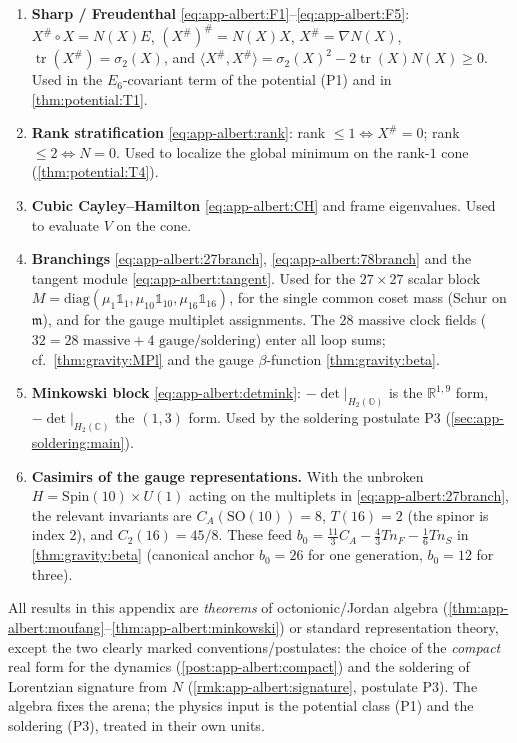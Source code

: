 \begin{enumerate}
  \item \textbf{Sharp / Freudenthal} \eqref{eq:app-albert:F1}--\eqref{eq:app-albert:F5}:
    $X^\#\circ X=N(X)E$, $(X^\#)^\#=N(X)X$, $X^\#=\nabla N(X)$,
    $\operatorname{tr}(X^\#)=\sigma_2(X)$, and
    $\langle X^\#,X^\#\rangle=\sigma_2(X)^2-2\operatorname{tr}(X)N(X)\ge0$. Used in
    the $E_6$-covariant term of the potential (P1) and in
    \autoref{thm:potential:T1}.
  \item \textbf{Rank stratification} \eqref{eq:app-albert:rank}: rank $\le1
    \Leftrightarrow X^\#=0$; rank $\le2\Leftrightarrow N=0$. Used to localize the
    global minimum on the rank-$1$ cone (\autoref{thm:potential:T4}).
  \item \textbf{Cubic Cayley--Hamilton} \eqref{eq:app-albert:CH} and frame
    eigenvalues. Used to evaluate $V$ on the cone.
  \item \textbf{Branchings} \eqref{eq:app-albert:27branch},
    \eqref{eq:app-albert:78branch} and the tangent module
    \eqref{eq:app-albert:tangent}. Used for the $27\times27$ scalar block
    $M=\mathrm{diag}(\mu_1\mathbb 1_1,\mu_{10}\mathbb 1_{10},\mu_{16}\mathbb 1_{16})$,
    for the single common coset mass (Schur on $\mathfrak m$), and for the gauge
    multiplet assignments. The $28$ massive clock fields
    ($32=28\text{ massive}+4\text{ gauge/soldering}$) enter all loop sums; cf.\
    \autoref{thm:gravity:MPl} and the gauge $\beta$-function
    \autoref{thm:gravity:beta}.
  \item \textbf{Minkowski block} \eqref{eq:app-albert:detmink}: $-\det|_{H_2
    (\mathbb O)}$ is the $\mathbb R^{1,9}$ form, $-\det|_{H_2(\mathbb C)}$ the
    $(1,3)$ form. Used by the soldering postulate P3
    (\autoref{sec:app-soldering:main}).
  \item \textbf{Casimirs of the gauge representations.} With the unbroken
    $H=\mathrm{Spin}(10)\times U(1)$ acting on the multiplets in
    \eqref{eq:app-albert:27branch}, the relevant invariants are
    $C_A(\mathrm{SO}(10))=8$, $T(16)=2$ (the spinor is index $2$), and
    $C_2(16)=45/8$. These feed
    $b_0=\tfrac{11}{3}C_A-\tfrac43 T n_F-\tfrac16 T n_S$ in
    \autoref{thm:gravity:beta} (canonical anchor $b_0=26$ for one generation,
    $b_0=12$ for three).
\end{enumerate}

\begin{remark}[Status]\label{rmk:app-albert:status}
All results in this appendix are \emph{theorems} of octonionic/Jordan algebra
(\autoref{thm:app-albert:moufang}--\autoref{thm:app-albert:minkowski}) or standard
representation theory, except the two clearly marked conventions/postulates: the
choice of the \emph{compact} real form for the dynamics
(\autoref{post:app-albert:compact}) and the soldering of Lorentzian signature from
$N$ (\autoref{rmk:app-albert:signature}, postulate P3). The algebra fixes the
arena; the physics input is the potential class (P1) and the soldering (P3),
treated in their own units.
\end{remark}
